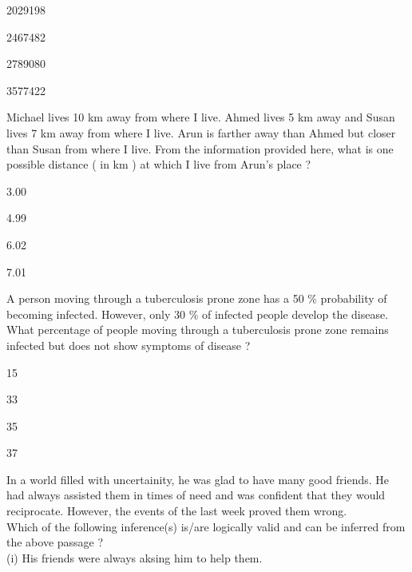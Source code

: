 		\begin{enumerate}
		\end{enumerate}
	\item Michael lives 10 km away from where I live. Ahmed lives 5 km away and Susan lives 7 km away from where I live. Arun is farther away than Ahmed but closer than Susan from where I live. From the information provided here, what is one possible distance ( in km ) at which I live from Arun's place ?
		\begin{enumerate}
				\begin{multicols}{4}
				\item 3.00
				\item 4.99
				\item 6.02
				\item 7.01
				\end{multicols}
		\end{enumerate}
	\item A person moving through a tuberculosis prone zone has a 50 \% probability of becoming infected. However, only 30 \% of infected people develop the disease. What percentage of people moving through a tuberculosis prone zone remains infected but does not show symptoms of disease ?
		\begin{enumerate}
				\begin{multicols}{4}
				\item 15
				\item 33
				\item 35
				\item 37
				\end{multicols}
		\end{enumerate}
	\item In a world filled with uncertainity, he was glad to have many good friends. He had always assisted them in times of need and was confident that they would reciprocate. However, the events of the last week proved them wrong. \\
		Which of the following inference(s) is/are logically valid and can be inferred from the above passage ? \\
		(i) His friends were always aksing him to help them. \\
